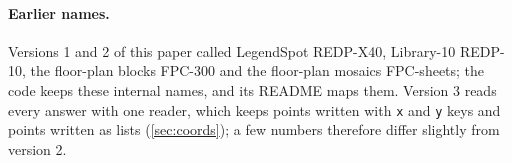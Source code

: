 \paragraph{Earlier names.} Versions 1 and 2 of this paper called LegendSpot REDP-X40, Library-10 REDP-10, the floor-plan blocks FPC-300 and the floor-plan mosaics FPC-sheets; the code keeps these internal names, and its README maps them. Version 3 reads every answer with one reader, which keeps points written with \texttt{x} and \texttt{y} keys and points written as lists (\cref{sec:coords}); a few numbers therefore differ slightly from version 2.
